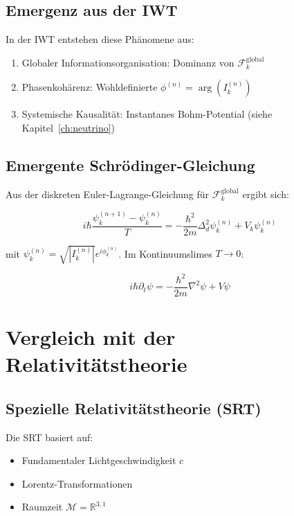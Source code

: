 \subsection{Emergenz aus der IWT}
\label{sub:vergleich_quanten_emergenz}

In der IWT entstehen diese Phänomene aus:

\begin{enumerate}
    \item Globaler Informationsorganisation: Dominanz von \( \mathcal{F}_k^{\text{global}} \)
    \item Phasenkohärenz: Wohldefinierte \( \phi^{(n)} = \arg(I_k^{(n)}) \)
    \item Systemische Kausalität: Instantanes Bohm-Potential (siehe Kapitel~\ref{ch:neutrino})
\end{enumerate}

\subsection{Emergente Schrödinger-Gleichung}
\label{sub:vergleich_quanten_schroedinger}

Aus der diskreten Euler-Lagrange-Gleichung für \( \mathcal{F}_k^{\text{global}} \) ergibt sich:

\[
i\hbar \frac{\psi_k^{(n+1)} - \psi_k^{(n)}}{T} = -\frac{\hbar^2}{2m} \Delta_d^2 \psi_k^{(n)} + V_k \psi_k^{(n)}
\]

mit \( \psi_k^{(n)} = \sqrt{|I_k^{(n)}|} e^{i\phi_k^{(n)}} \). Im Kontinuumslimes \( T \to 0 \):

\[
i\hbar \partial_t \psi = -\frac{\hbar^2}{2m} \nabla^2 \psi + V \psi
\]

\section{Vergleich mit der Relativitätstheorie}
\label{app:vergleich_relativitaet}

\subsection{Spezielle Relativitätstheorie (SRT)}
\label{sub:vergleich_srt}

Die SRT basiert auf:

\begin{itemize}
    \item Fundamentaler Lichtgeschwindigkeit \( c \)
    \item Lorentz-Transformationen
    \item Raumzeit \( \mathcal{M} = \mathbb{R}^{3,1} \)
\end{itemize}

